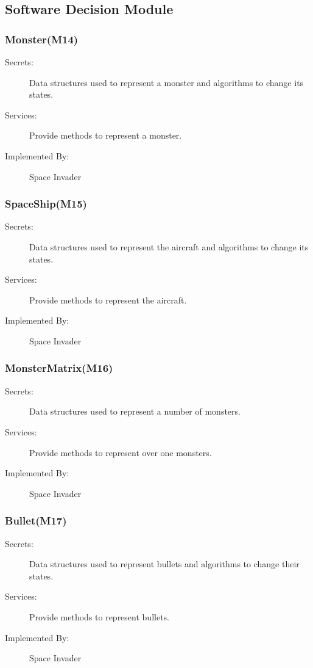 \documentclass[12pt]{article}
\begin{document}
\subsection{Software Decision Module}

\subsubsection{Monster(M14)}
\begin{description}
\item[Secrets:] Data structures used to represent a monster and algorithms to change its states.
\item[Services:] Provide methods to represent a monster. 
\item[Implemented By:] Space Invader
\end{description}

\subsubsection{SpaceShip(M15)}
\begin{description}
\item[Secrets:] Data structures used to represent the aircraft and algorithms to change its states.
\item[Services:] Provide methods to represent the aircraft. 
\item[Implemented By:] Space Invader
\end{description}

\subsubsection{MonsterMatrix(M16)}
\begin{description}
\item[Secrets:] Data structures used to represent a number of monsters.
\item[Services:] Provide methods to represent over one monsters. 
\item[Implemented By:] Space Invader
\end{description}

\subsubsection{Bullet(M17)}
\begin{description}
\item[Secrets:] Data structures used to represent bullets and algorithms to change their states.
\item[Services:] Provide methods to represent bullets. 
\item[Implemented By:] Space Invader
\end{description}
\end{document}
